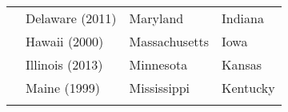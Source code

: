\documentclass[11pt,]{article}
\begin{document}
\begin{longtable}[]{@{}llll@{}}
\begin{minipage}[t]{0.20\columnwidth}
\strut
\end{minipage} & \begin{minipage}[t]{0.26\columnwidth}\raggedright
Delaware (2011)\strut
\end{minipage} & \begin{minipage}[t]{0.24\columnwidth}\raggedright
Maryland\strut
\end{minipage} & \begin{minipage}[t]{0.19\columnwidth}\raggedright
Indiana\strut
\end{minipage}\tabularnewline
\begin{minipage}[t]{0.20\columnwidth}\raggedright
\strut
\end{minipage} & \begin{minipage}[t]{0.26\columnwidth}\raggedright
Hawaii (2000)\strut
\end{minipage} & \begin{minipage}[t]{0.24\columnwidth}\raggedright
Massachusetts\strut
\end{minipage} & \begin{minipage}[t]{0.19\columnwidth}\raggedright
Iowa\strut
\end{minipage}\tabularnewline
\begin{minipage}[t]{0.20\columnwidth}\raggedright
\strut
\end{minipage} & \begin{minipage}[t]{0.26\columnwidth}\raggedright
Illinois (2013)\strut
\end{minipage} & \begin{minipage}[t]{0.24\columnwidth}\raggedright
Minnesota\strut
\end{minipage} & \begin{minipage}[t]{0.19\columnwidth}\raggedright
Kansas\strut
\end{minipage}\tabularnewline
\begin{minipage}[t]{0.20\columnwidth}\raggedright
\strut
\end{minipage} & \begin{minipage}[t]{0.26\columnwidth}\raggedright
Maine (1999)\strut
\end{minipage} & \begin{minipage}[t]{0.24\columnwidth}\raggedright
Mississippi\strut
\end{minipage} & \begin{minipage}[t]{0.19\columnwidth}\raggedright
Kentucky\strut
\end{minipage}\tabularnewline
\begin{minipage}[t]{0.20\columnwidth}\raggedright

\end{minipage}
\end{longtable}
\end{document}
